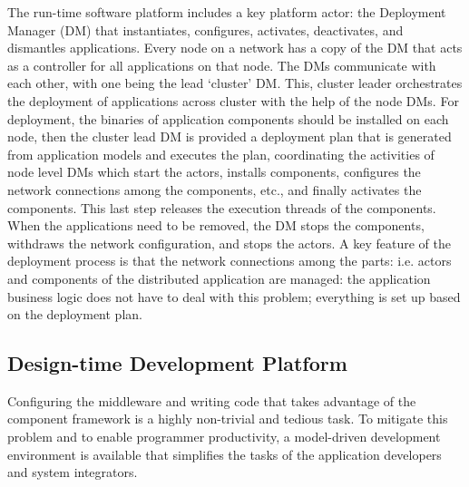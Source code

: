 
The run-time software platform includes a key platform actor: the
Deployment Manager (DM) that instantiates, configures, activates, deactivates,
and dismantles applications. Every node on a network has a copy of the DM that acts
as a controller for all applications on that node. The DMs communicate
with each other, with one being the lead  `cluster' DM. This, cluster
leader orchestrates the deployment of applications across cluster
with the help of the node DMs. For deployment, the binaries of
application components should be installed on each node, then the
cluster lead DM is provided a deployment plan that is generated from
application models and executes the plan, coordinating the activities
of node level DMs which start the actors, installs components,
configures the network connections among the components, etc., and
finally activates the components. This last step releases the
execution threads of the components. When the applications need to be
removed, the DM stops the components, withdraws the network
configuration, and stops the actors. A key feature of the deployment
process is that the network connections among the parts: i.e. actors
and components of the distributed application are managed: the
application business logic does not have to deal with this problem;
everything is set up based on the deployment plan.

\subsection{Design-time Development Platform}
Configuring the middleware and writing code that takes advantage of
the component framework is a highly non-trivial and tedious task. To
mitigate this problem and to enable programmer productivity, a
model-driven development environment is available that simplifies the
tasks of the application developers and system integrators.

